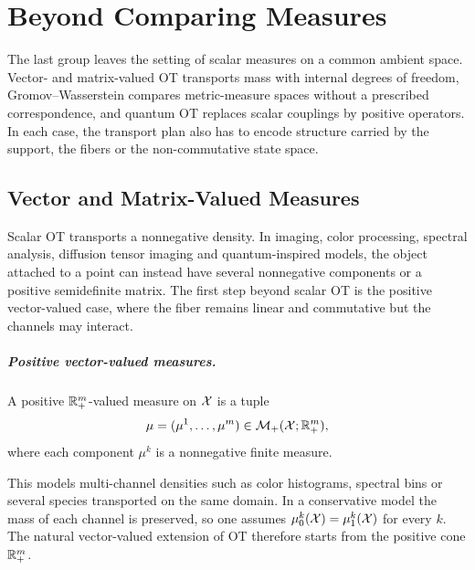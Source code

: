 
\chapter{Beyond Comparing Measures}
\label{sec-beyond-comparing-measures}

The last group leaves the setting of scalar measures on a common ambient space. Vector- and matrix-valued OT transports mass with internal degrees of freedom, Gromov--Wasserstein compares metric-measure spaces without a prescribed correspondence, and quantum OT replaces scalar couplings by positive operators. In each case, the transport plan also has to encode structure carried by the support, the fibers or the non-commutative state space.

\section{Vector and Matrix-Valued Measures}
\label{sec-vector-matrix-valued-measures}

Scalar OT transports a nonnegative density. In imaging, color processing, spectral analysis, diffusion tensor imaging and quantum-inspired models, the object attached to a point can instead have several nonnegative components or a positive semidefinite matrix. The first step beyond scalar OT is the positive vector-valued case, where the fiber remains linear and commutative but the channels may interact.

\paragraph{Positive vector-valued measures.}

\begin{defn}\label{def-positive-vector-valued-measure}
	A positive $\mathbb{R}_+^m$-valued measure on $\mathcal{X}$ is a tuple
	\[
		\mu=(\mu^1,\ldots,\mu^m)\in\mathcal{M}_+(\mathcal{X};\mathbb{R}_+^m),
	\]
	where each component $\mu^k$ is a nonnegative finite measure.
\end{defn}
This models multi-channel densities such as color histograms, spectral bins or several species transported on the same domain. In a conservative model the mass of each channel is preserved, so one assumes $\mu_0^k(\mathcal{X})=\mu_1^k(\mathcal{X})$ for every $k$. The natural vector-valued extension of OT therefore starts from the positive cone $\mathbb{R}_+^m$.

